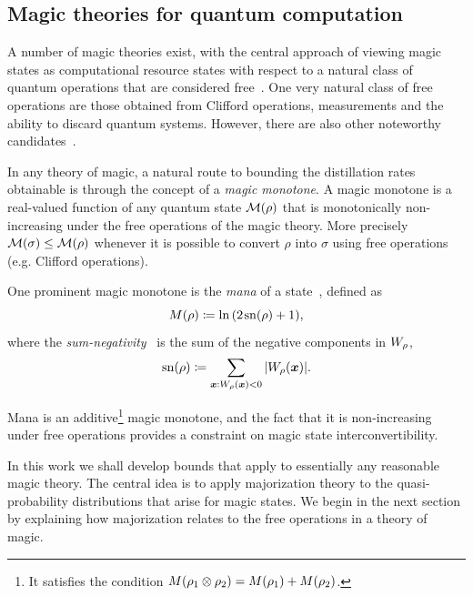 \documentclass[pra,
aps,
twocolumn,
superscriptaddress,
groupedaddress,
nofootinbib,
reprint
]{revtex4-1}
\begin{document}
\subsection{Magic theories for quantum computation}
\label{sec:mono}

A number of magic theories exist, with the central approach of viewing magic states as computational resource states with respect to a natural class of quantum operations that are considered free~\cite{Gour_2019}. One very natural class of free operations are those obtained from Clifford operations, measurements and the ability to discard quantum systems. However, there are also other noteworthy candidates~\cite{cit:ahmadi, cit:seddon, Wang_2019}.

In any theory of magic, a natural route to bounding the distillation rates obtainable is through the concept of a \emph{magic monotone}. A magic monotone is a real-valued function of any quantum state ${\mathcal M}(\rho)$ that is monotonically non-increasing under the free operations of the magic theory. More precisely ${\mathcal M}(\sigma) \le {\mathcal M}(\rho)$ whenever it is possible to convert $\rho$ into $\sigma$ using free operations (e.g. Clifford operations).

One prominent magic monotone is the \emph{mana} of a state~\cite{cit:veitch2}, defined as
\begin{equation}
    {M(\rho)} \coloneqq \ln{(2\hspace{1pt} {{\rm{sn}}(\rho)} +1)},
\end{equation}
where the \emph{sum-negativity}~\cite{cit:veitch2} is the sum of the negative components in $\W{\rho}$,
\begin{equation}
    \sn{\rho} \coloneqq \sum\limits_{\bmx: \W[\bmx]{\rho} < 0} \abs{\W[\bmx]{\rho}}.
\end{equation}

Mana is an additive\footnote{It satisfies the condition ${M(\rho_1 \otimes \rho_2)} = {M(\rho_1)} + {M(\rho_2)}$.} magic monotone, and the fact that it is non-increasing under free operations provides a constraint on magic state interconvertibility.

In this work we shall develop bounds that apply to essentially any reasonable magic theory. The central idea is to apply majorization theory to the quasi-probability distributions that arise for magic states. We begin in the next section by explaining how majorization relates to the free operations in a theory of magic.


\end{document}
